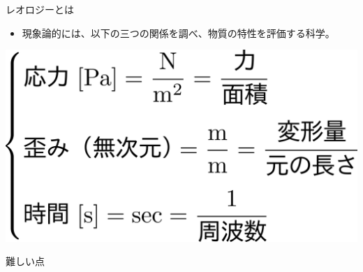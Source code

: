 \begin{frame}

\begin{block}{レオロジーとは}

\begin{itemize}

\item
  現象論的には、以下の三つの関係を調べ、物質の特性を評価する科学。
\end{itemize}

\includegraphics{fig/fig_1/レオロジーの関係.png}

\end{block}

\end{frame}

\begin{frame}

\begin{block}{難しい点}

\end{block}

\end{frame}

